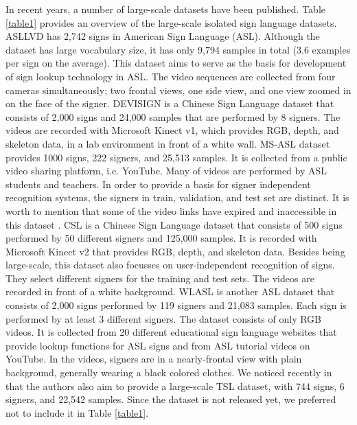 \documentclass[11pt, a4paper, singlecolumn]{article}
\begin{document}
In recent years, a number of large-scale datasets have been published. Table \ref{table1} provides an overview of the large-scale isolated sign language datasets. ASLLVD \cite{neidle2012challenges} has 2,742 signs in American Sign Language (ASL). Although the dataset has large vocabulary size, it has only 9,794 samples in total (3.6 examples per sign on the average). This dataset aims to serve as the basis for development of sign lookup technology in ASL. The video sequences are collected from four cameras simultaneously; two frontal views, one side view, and one view zoomed in on the face of the signer. DEVISIGN \cite{chai2015devisign} is a Chinese Sign Language dataset that consists of 2,000 signs and 24,000 samples that are performed by 8 signers. The videos are recorded with Microsoft Kinect v1, which provides RGB, depth, and skeleton data, in a lab environment in front of a white wall. MS-ASL dataset \cite{joze2018ms} provides 1000 signs, 222 signers, and 25,513 samples. It is collected from a public video sharing platform, i.e. YouTube. Many of videos are performed by ASL students and teachers. In order to provide a basis for signer independent recognition systems, the signers in train, validation, and test set are distinct. It is worth to mention that some of the video links have expired and inaccessible in this dataset \cite{li2020transferring}. CSL \cite{huang2018attention} is a Chinese Sign Language dataset that consists of 500 signs performed by 50 different signers and 125,000 samples. It is recorded with Microsoft Kinect v2 that provides RGB, depth, and skeleton data. Besides being large-scale, this dataset also focusses on user-independent recognition of signs. They select different signers for the training and test sets. The videos are recorded in front of a white background. WLASL \cite{li2020word} is another ASL dataset that consists of 2,000 signs performed by 119 signers and 21,083 samples. Each sign is performed by at least 3 different signers. The dataset consists of only RGB videos. It is collected from 20 different educational sign language websites that provide lookup functions for ASL signs and from ASL tutorial videos on YouTube. In the videos, signers are in a nearly-frontal view with plain background, generally wearing a black colored clothes. We noticed recently in \cite{ozdemir2020bosphorussign22k} that the authors also aim to provide a large-scale TSL dataset, with 744 signs, 6 signers, and 22,542 samples. Since the dataset is not released yet, we preferred not to include it in Table \ref{table1}.
\end{document}
